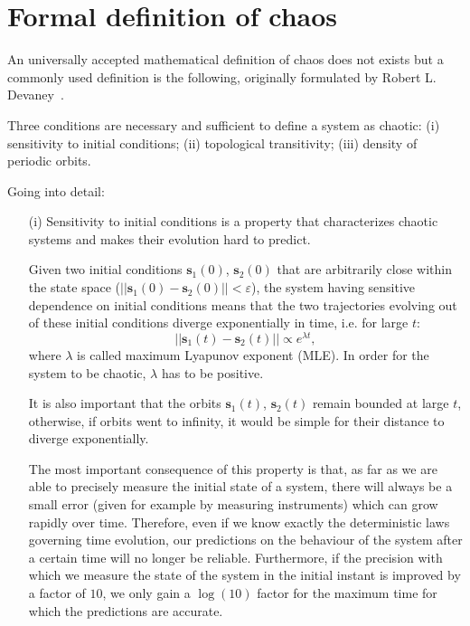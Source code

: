 \section{Formal definition of chaos}\label{sec: chaos in theory}

An universally accepted mathematical definition of chaos does not exists but
a commonly used definition is the following, originally formulated by Robert L.
Devaney~\cite{ref:chaos_definition}.

Three conditions are necessary and
sufficient to define a system as chaotic: (i) sensitivity to initial conditions;
(ii) topological transitivity;
(iii) density of periodic orbits.

Going into detail:
\begin{itemize}
    \item[(i)] Sensitivity to initial conditions is a property that characterizes chaotic
    systems and makes their evolution hard to predict.

    Given two initial conditions $\mathbf{s}_1(0)$, $\mathbf{s}_2(0)$ that are arbitrarily close within the state
    space ($||\mathbf{s}_1(0)-\mathbf{s}_2(0)||<\varepsilon$),
    the system having sensitive dependence on initial conditions means that
    the two trajectories evolving out of these initial conditions diverge exponentially in time, i.e.
    for large $t$:
    \begin{equation}
    \label{eq: trajectory divergence}
        ||\mathbf{s}_1(t)-\mathbf{s}_2(t)||\propto e^{\lambda t},
    \end{equation}
    where $\lambda$ is called maximum Lyapunov exponent (MLE).
    In order for the system to be chaotic, $\lambda$ has to be positive.

    It is also important that the orbits $\mathbf{s}_1(t)$, $\mathbf{s}_2(t)$ remain bounded at large $t$,
    otherwise, if orbits went to infinity, it would be simple for their distance to diverge exponentially.
    
    The most important consequence of this property is that, as far as we are
    able to precisely measure the initial state of a system, there will always be
    a small error (given for example by measuring instruments) which can grow
    rapidly over time. Therefore, even if we know exactly the deterministic laws
    governing time evolution, our predictions on the behaviour of the system
    after a certain time will no longer be reliable. Furthermore, if the precision
    with which we measure the state of the system in the initial instant is
    improved by a factor of $10$, we only gain a $\log(10)$ factor for the maximum
    time for which the predictions are accurate.


\end{itemize}
